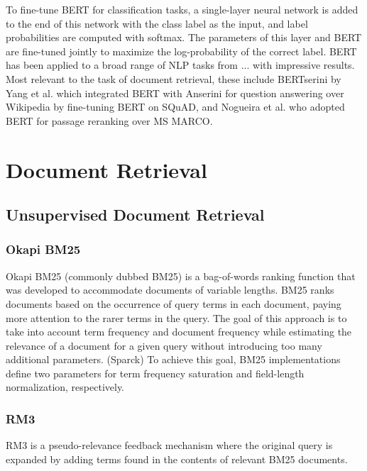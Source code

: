 To fine-tune BERT for classification tasks, a single-layer neural network is added to the end of this network with the class label as the input, and label probabilities are computed with softmax.
The parameters of this layer and BERT are fine-tuned jointly to maximize the log-probability of the correct label.
BERT has been applied to a broad range of NLP tasks from ... with impressive results.
Most relevant to the task of document retrieval, these include BERTserini by Yang et al. \cite{yang2019end} which integrated BERT with Anserini for question answering over Wikipedia by fine-tuning BERT on SQuAD, and Nogueira et al. \cite{nogueira2019passage} who adopted BERT for passage reranking over MS MARCO.

\section{Document Retrieval}

\subsection{Unsupervised Document Retrieval}


\subsubsection{Okapi BM25}


Okapi BM25 (commonly dubbed BM25) is a bag-of-words ranking function that was developed to accommodate documents of variable lengths.
BM25 ranks documents based on the occurrence of query terms in each document, paying more attention to the rarer terms in the query.
The goal of this approach is to take into account term frequency and document frequency while estimating the relevance of a document for a given query without introducing too many additional parameters. (Sparck)
To achieve this goal, BM25 implementations define two parameters for term frequency saturation and field-length normalization, respectively.

\subsubsection{RM3}

RM3 is a pseudo-relevance feedback mechanism where the original query is expanded by adding terms found in the contents of relevant BM25 documents.


